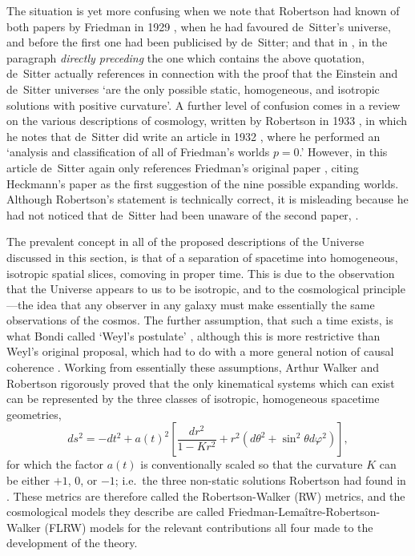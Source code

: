 The situation is yet more confusing when we note that Robertson had known of both papers by Friedman in 1929 \cite{Robertson1929}, when he had favoured de~Sitter's universe, and before the first one had been publicised by de~Sitter; and that in \cite{deSitter1933a}, in the paragraph \textit{directly preceding} the one which contains the above quotation, de~Sitter actually references \cite{Robertson1929} in connection with the proof that the Einstein and de~Sitter universes `are the only possible static, homogeneous, and isotropic solutions with positive curvature'. A further level of confusion comes in a review on the various descriptions of cosmology, written by Robertson in 1933 \cite{Robertson1933}, in which he notes that de~Sitter did write an article in 1932 \cite{deSitter1932}, where he performed an `analysis and classification of all of Friedman's worlds $p=0$.' However, in this article de~Sitter again only references Friedman's original paper \cite{Friedmann1922,Friedmann1999a}, citing Heckmann's paper \cite{Heckmann1931} as the first suggestion of the nine possible expanding worlds. Although Robertson's statement is technically correct, it is misleading because he had not noticed that de~Sitter had been unaware of the second paper, \cite{Friedmann1924,Friedmann1999b}.

The prevalent concept in all of the proposed descriptions of the Universe discussed in this section, is that of a separation of spacetime into homogeneous, isotropic spatial slices, comoving in proper time. This is due to the observation that the Universe appears to us to be isotropic, and to the cosmological principle---the idea that any observer in any galaxy must make essentially the same observations of the cosmos. The further assumption, that such a time exists, is what Bondi called `Weyl's postulate' \cite{Bondi1961}, although this is more restrictive than Weyl's original proposal, which had to do with a more general notion of causal coherence \cite{Ehlers2009}. Working from essentially these assumptions, Arthur Walker \cite{Walker1935a,Walker1935b,Walker1937} and Robertson \cite{Robertson1935,Robertson1936a,Robertson1936b} rigorously proved that the only kinematical systems which can exist can be represented by the three classes of isotropic, homogeneous spacetime geometries, 
\begin{equation}
ds^2=-dt^2+a(t)^2\left[\frac{dr^2}{1-Kr^2}+r^2(d\theta^2+\sin^2\theta{d}\varphi^2)\right],\label{RW}
\end{equation}
for which the factor $a(t)$ is conventionally scaled so that the curvature $K$ can be either $+1$, 0, or $-1$; i.e.~the three non-static solutions Robertson had found in \cite{Robertson1929}. These metrics are therefore called the Robertson-Walker (RW) metrics, and the cosmological models they describe are called Friedman-Lema\^{i}tre-Robertson-Walker (FLRW) models for the relevant contributions all four made to the development of the theory.

